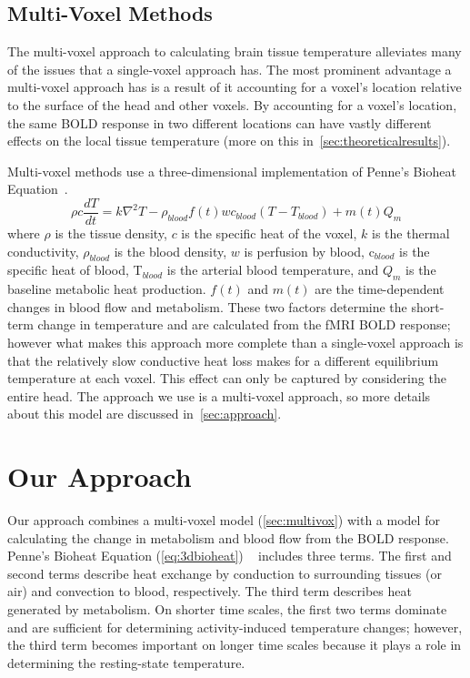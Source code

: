     \subsection{\label{sec:multivox} Multi-Voxel Methods}
    The multi-voxel approach to calculating brain tissue temperature alleviates many of the issues that a single-voxel approach has.  The most prominent advantage a multi-voxel approach has is a result of it accounting for a voxel's location relative to the surface of the head and other voxels.  By accounting for a voxel's location, the same BOLD response in two different locations can have vastly different effects on the local tissue temperature (more on this in~\cref{sec:theoreticalresults}).
    
    Multi-voxel methods use a three-dimensional implementation of Penne's Bioheat Equation~\citep{collins}.
    \begin{equation} \label{eq:3dbioheat} 
    	\rho c \frac{dT}{dt} = k \nabla^{2}T-\rho_{blood}f(t)wc_{blood}(T-T_{blood})+m(t)Q_{m} 
    \end{equation}
  where $\rho$ is the tissue density, $c$ is the specific heat of the voxel, $k$ is the thermal conductivity, $\rho_{blood}$ is the blood density, $w$ is perfusion by blood, c$_{blood}$ is the specific heat of blood, T$_{blood}$ is the arterial blood temperature, and $Q_{m}$ is the baseline metabolic heat production. $f(t)$ and $m(t)$ are the time-dependent changes in blood flow and metabolism. These two factors determine the short-term change in temperature and are calculated from the fMRI BOLD response; however what makes this approach more complete than a single-voxel approach is that the relatively slow conductive heat loss makes for a different equilibrium temperature at each voxel.  This effect can only be captured by considering the entire head.  The approach we use is a multi-voxel approach, so more details about this model are discussed in~\cref{sec:approach}.

\section{\label{sec:approach} Our Approach}
  Our approach combines a multi-voxel model (\cref{sec:multivox}) with a model for calculating the change in metabolism and blood flow from the BOLD response.  Penne's Bioheat Equation (\cref{eq:3dbioheat}) ~\citep{pennes,sotero2011} includes three terms. The first and second terms describe heat exchange by conduction to surrounding tissues (or air) and convection to blood, respectively.  The third term describes heat generated by metabolism. On shorter time scales, the first two terms dominate and are sufficient for determining activity-induced temperature changes; however, the third term becomes important on longer time scales because it plays a role in determining the resting-state temperature.
  
